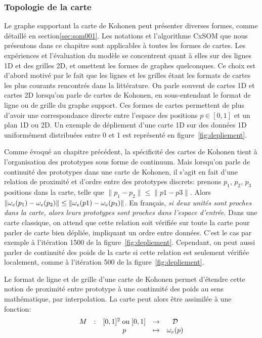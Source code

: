 \subsubsection{Topologie de la carte}
Le graphe supportant la carte de Kohonen peut présenter diverses formes, comme détaillé en section\ref{sec:som001}. Les notations et l'algorithme CxSOM que nous présentons dans ce chapitre sont applicables à toutes les formes de cartes. Les expériences et l'évaluation du modèle se concentrent quant à elles sur des lignes 1D et des grilles 2D, et omettent les formes de graphes quelconques. Ce choix est d'abord motivé par le fait que les lignes et les grilles étant les formats de cartes les plus courants rencontrés dans la littérature. On parle souvent de cartes 1D et cartes 2D lorsqu'on parle de cartes de Kohonen, en sous-entendant le format de ligne ou de grille du graphe support. Ces formes de cartes permettent de plus d'avoir une correspondance directe entre l'espace des positions $p \in [0,1]$ et un plan 1D ou 2D. Un exemple de dépliement d'une carte 1D sur des données 1D uniformément distribuées entre 0 et 1 est représenté en figure~\ref{fig:depliement}.


Comme évoqué au chapitre précédent, la spécificité des cartes de Kohonen tient à l'organisation des prototypes sous forme de continuum. Mais lorsqu'on parle de continuité des prototypes dans une carte de Kohonen, il s'agit en fait d'une relation de proximité et d'ordre entre des prototypes discrets: prenons $p_1$, $p_2$, $p_3$ positions dans la carte, telle que $\lVert p_1 - p_2 \rVert \leq \lVert p1 - p3 \rVert$. Alors $\lVert \omega_e(p_1) - \omega_e(p_2) \rVert \leq \lVert \omega_e(p1) - \omega_e(p_3) \rVert$. En français, \emph{si deux unités sont proches dans la carte, alors leurs prototypes sont proches dans l'espace d'entrée}. Dans une carte classique, on attend que cette relation soit vérifiée sur toute la carte pour parler de carte bien dépliée, impliquant un ordre entre données. C'est le cas par exemple à l'itération 1500 de la figure~\ref{fig:depliement}. Cependant, on peut aussi parler de continuité des poids de la carte si cette relation est seulement vérifiée localement, comme à l'itération 500 de la figure~\ref{fig:depliement}.

Le format de ligne et de grille d'une carte de Kohonen permet d'étendre cette notion de proximité entre prototype à une continuité des poids au sens mathématique, par interpolation. La carte peut alors être assimilée à une fonction:
\begin{equation*}
\begin{array}{ccccc}
M& : & [0,1]^2 \; \text{ou} \;[0,1] & \to &  \mathcal{D} \\
 & & p & \mapsto & \omega_e(p) \\
\end{array}
\end{equation*}

